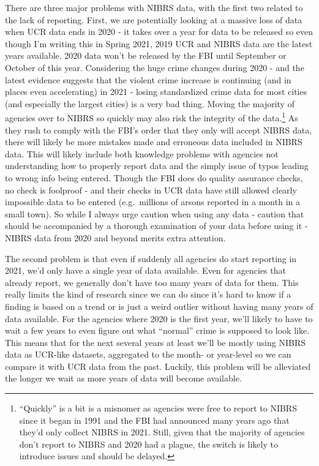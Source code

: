\documentclass[
  12pt,
  openany]{book}
\begin{document}
There are three major problems with NIBRS data, with the first two related to the lack of reporting. First, we are potentially looking at a massive loss of data when UCR data ends in 2020 - it takes over a year for data to be released so even though I'm writing this in Spring 2021, 2019 UCR and NIBRS data are the latest years available. 2020 data won't be released by the FBI until September or October of this year. Considering the huge crime changes during 2020 - and the latest evidence suggests that the violent crime increase is continuing (and in places even accelerating) in 2021 - losing standardized crime data for most cities (and especially the largest cities) is a very bad thing. Moving the majority of agencies over to NIBRS so quickly may also risk the integrity of the data.\footnote{``Quickly'' is a bit is a misnomer as agencies were free to report to NIBRS since it began in 1991 and the FBI had announced many years ago that they'd only collect NIBRS in 2021. Still, given that the majority of agencies don't report to NIBRS and 2020 had a plague, the switch is likely to introduce issues and should be delayed.} As they rush to comply with the FBI's order that they only will accept NIBRS data, there will likely be more mistakes made and erroneous data included in NIBRS data. This will likely include both knowledge problems with agencies not understanding how to properly report data and the simply issue of typos leading to wrong info being entered. Though the FBI does do quality assurance checks, no check is foolproof - and their checks in UCR data have still allowed clearly impossible data to be entered (e.g.~millions of arsons reported in a month in a small town). So while I always urge caution when using any data - caution that should be accompanied by a thorough examination of your data before using it - NIBRS data from 2020 and beyond merits extra attention.

The second problem is that even if suddenly all agencies do start reporting in 2021, we'd only have a single year of data available. Even for agencies that already report, we generally don't have too many years of data for them. This really limits the kind of research since we can do since it's hard to know if a finding is based on a trend or is just a weird outlier without having many years of data available. For the agencies where 2020 is the first year, we'll likely to have to wait a few years to even figure out what ``normal'' crime is supposed to look like. This means that for the next several years at least we'll be mostly using NIBRS data as UCR-like datasets, aggregated to the month- or year-level so we can compare it with UCR data from the past. Luckily, this problem will be alleviated the longer we wait as more years of data will become available.
\end{document}
